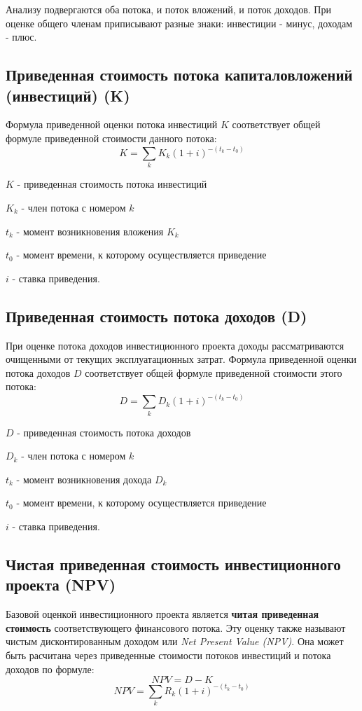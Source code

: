 \documentclass[aps,%
12pt,%
final,%
oneside,
onecolumn,%
musixtex, %
superscriptaddress,%
centertags]{article} %
\theoremstyle{plain}
\theoremstyle{definition}
\theoremstyle{remark}
\begin{document}
Анализу подвергаются оба потока, и поток вложений, и поток доходов. При оценке общего членам приписывают разные знаки: инвестиции - минус, доходам - плюс.

\subsection{Приведенная стоимость потока капиталовложений (инвестиций) (K)}

Формула приведенной оценки потока инвестиций $K$ соответствует общей формуле приведенной стоимости данного потока:
$$K = \sum\limits_k K_k (1+i)^{-(t_k - t_0)}$$

$K$ - приведенная стоимость потока инвестиций

$K_k$ - член потока с номером $k$

$t_k$ - момент возникновения вложения $K_k$

$t_0$ - момент времени, к которому осуществляется приведение

$i$ - ставка приведения.

\subsection{Приведенная стоимость потока доходов (D)}

При оценке потока доходов инвестиционного проекта доходы рассматриваются очищенными от текущих эксплуатационных затрат. Формула приведенной оценки потока доходов $D$ соответствует общей формуле приведенной стоимости этого потока:
$$D = \sum\limits_k D_k (1+i)^{-(t_k - t_0)}$$

$D$ - приведенная стоимость потока доходов

$D_k$ - член потока с номером $k$

$t_k$ - момент возникновения дохода $D_k$

$t_0$ - момент времени, к которому осуществляется приведение

$i$ - ставка приведения.

\subsection{Чистая приведенная стоимость инвестиционного проекта (NPV)}

Базовой оценкой инвестиционного проекта является \textbf{читая приведенная стоимость} соответствующего финансового потока. Эту оценку также называют чистым дисконтированным доходом или \textit{Net Present Value (NPV)}. Она может быть расчитана через приведенные стоимости потоков инвестиций и потока доходов по формуле:
$$NPV = D-K$$
$$NPV = \sum\limits_k R_k (1+i)^{-(t_k - t_0)}$$
\end{document}
